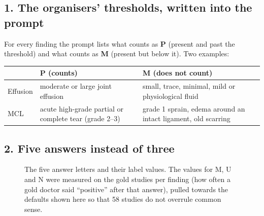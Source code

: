 \subsection*{1. The organisers' thresholds, written into the prompt}

For every finding the prompt lists what counts as \textbf{P} (present and past the threshold) and what counts as
\textbf{M} (present but below it). Two examples:

\begin{center}\small
\begin{tabularx}{\linewidth}{l>{\raggedright\arraybackslash}X>{\raggedright\arraybackslash}X}
\toprule
 & P (counts) & M (does not count) \\
\midrule
Effusion & moderate or large joint effusion & small, trace, minimal, mild or physiological fluid \\
MCL & acute high-grade partial or complete tear (grade 2--3) & grade 1 sprain, edema around an intact ligament, old scarring \\
\bottomrule
\end{tabularx}
\end{center}

\subsection*{2. Five answers instead of three}

\begin{figure}[H]
\centering
{}
\caption{The five answer letters and their label values. The values for M, U and N were measured on the gold
studies per finding (how often a gold doctor said ``positive'' after that answer), pulled towards the defaults
shown here so that 58 studies do not overrule common sense.}
\label{fig:letters}
\end{figure}


